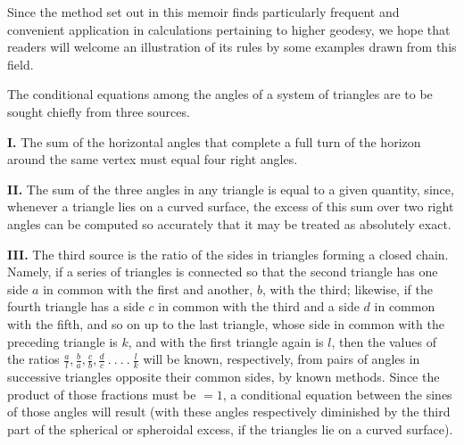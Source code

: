 Since the method set out in this memoir finds particularly frequent and convenient application in calculations pertaining to higher geodesy, we hope that readers will welcome an illustration of its rules by some examples drawn from this field.

The conditional equations among the angles of a system of triangles are to be sought chiefly from three sources.

\par\noindent\textbf{I.} The sum of the horizontal angles that complete a full turn of the horizon around the same vertex must equal four right angles.

\par\noindent\textbf{II.} The sum of the three angles in any triangle is equal to a given quantity, since, whenever a triangle lies on a curved surface, the excess of this sum over two right angles can be computed so accurately that it may be treated as absolutely exact.

\par\noindent\textbf{III.} The third source is the ratio of the sides in triangles forming a closed chain. Namely, if a series of triangles is connected so that the second triangle has one side \(a\) in common with the first and another, \(b\), with the third; likewise, if the fourth triangle has a side \(c\) in common with the third and a side \(d\) in common with the fifth, and so on up to the last triangle, whose side in common with the preceding triangle is \(k\), and with the first triangle again is \(l\), then the values of the ratios \(\frac al,\allowbreak\frac ba,\allowbreak\frac cb,\allowbreak\frac dc\ .\ .\ .\ .\ \frac lk\) will be known, respectively, from pairs of angles in successive triangles opposite their common sides, by known methods. Since the product of those fractions must be \(=1\), a conditional equation between the sines of those angles will result (with these angles respectively diminished by the third part of the spherical or spheroidal excess, if the triangles lie on a curved surface).

